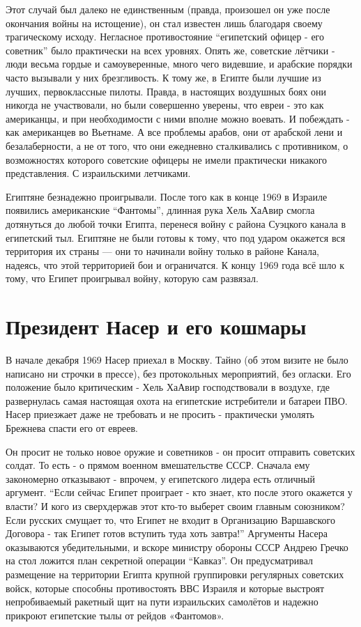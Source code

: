 Этот случай был далеко не единственным (правда, произошел он уже после окончания войны на истощение), он стал известен лишь благодаря своему трагическому исходу. Негласное противостояние “египетский офицер - его советник” было практически на всех уровнях. Опять же, советские лётчики - люди весьма гордые и самоуверенные, много чего видевшие, и арабские порядки часто вызывали у них брезгливость. К тому же, в Египте были лучшие из лучших, первоклассные пилоты. Правда, в настоящих воздушных боях они никогда не участвовали, но были совершенно уверены, что евреи - это как американцы, и при необходимости с ними вполне можно воевать. И побеждать - как американцев во Вьетнаме. А все проблемы арабов, они от арабской лени и безалаберности, а не от того, что они ежедневно сталкивались с противником, о возможностях которого советские офицеры не имели практически никакого представления. С израильскими летчиками.

Египтяне безнадежно проигрывали. После того как в конце 1969 в Израиле появились американские “Фантомы”, длинная рука Хель ХаАвир смогла дотянуться до любой точки Египта, перенеся войну с района Суэцкого канала в египетский тыл. Египтяне не были готовы к тому, что под ударом окажется вся территория их страны — они то начинали войну только в районе Канала, надеясь, что этой территорией бои и ограничатся. К концу 1969 года всё шло к тому, что Египет проигрывал войну, которую сам развязал.

\section{Президент Насер и его кошмары}

В начале декабря 1969 Насер приехал в Москву. Тайно (об этом визите не было написано ни строчки в прессе), без протокольных мероприятий, без огласки. Его положение было критическим - Хель ХаАвир господствовали в воздухе, где развернулась самая настоящая охота на египетские истребители и батареи ПВО.
Насер приезжает даже не требовать и не просить - практически умолять Брежнева спасти его от евреев.

Он просит не только новое оружие и советников - он просит отправить советских солдат. То есть - о прямом военном вмешательстве СССР. Сначала ему закономерно отказывают - впрочем, у египетского лидера есть отличный аргумент. “Если сейчас Египет проиграет - кто знает, кто после этого окажется у власти? И кого из сверхдержав этот кто-то выберет своим главным союзником? Если русских смущает то, что Египет не входит в Организацию Варшавского Договора - так Египет готов вступить туда хоть завтра!” Аргументы Насера оказываются убедительными, и вскоре министру обороны СССР Андрею Гречко на стол ложится план секретной операции “Кавказ”. Он предусматривал размещение на территории Египта крупной группировки регулярных советских войск, которые способны противостоять ВВС Израиля и которые выстроят непробиваемый ракетный щит на пути израильских самолётов и надежно прикроют египетские тылы от рейдов «Фантомов».

